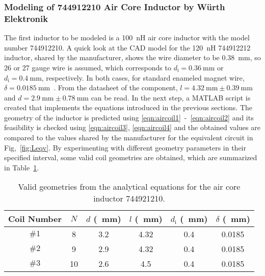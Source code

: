 \subsubsection{Modeling of 744912210 Air Core Inductor by Würth Elektronik}
The first inductor to be modeled is a \SI{100}{\nano\henry} air core inductor with the model number 744912210. A quick look at the CAD model for the \SI{120}{\nano\henry} 744912212 inductor, shared by the manufacturer, shows the wire diameter to be \SI{0.38}{\milli\meter}, so 26 or 27 gauge wire is assumed, which corresponds to $d_\mathrm{i} = \SI{0.36}{\milli\meter}$ or $d_\mathrm{i} = \SI{0.4}{\milli\meter}$, respectively. In both cases, for standard enameled magnet wire, $\delta = \SI{0.0185}{\milli\meter}$~\cite{electronbunker}. From the datasheet of the component, $l = \SI{4.32}{\milli\meter} \pm \SI{0.39}{\milli\meter}$ and $d = \SI{2.9}{\milli\meter} \pm \SI{0.78}{\milli\meter}$ can be read. In the next step, a MATLAB script is created that implements the equations introduced in the previous sections. The geometry of the inductor is predicted using \eqref{eqn:aircoil1}~-~\eqref{eqn:aircoil2} and its feasibility is checked using \eqref{eqn:aircoil3}, \eqref{eqn:aircoil4} and the obtained values are compared to the values shared by the manufacturer for the equivalent circuit in Fig,~\ref{fig:Leqv}. By experimenting with different geometry parameters in their specified interval, some valid coil geometries are obtained, which are summarized in Table~\ref{tab:valid_geom}.
\begin{table}[ptbh]
	\centering
	\begin{tabular}{|c| c c c c c|}
		\hline
		Coil Number & $N$ & $d$ (\SI{}{\milli\meter}) & $l$ (\SI{}{\milli\meter}) & $d_\mathrm{i}$ (\SI{}{\milli\meter}) & $\delta$ (\SI{}{\milli\meter})\\
		\hline
		$\#1$ & 8 & 3.2  & 4.32 & 0.4 & 0.0185 \\
		$\#2$ & 9 & 2.9 & 4.32 &  0.4 & 0.0185\\
		$\#3$ & 10 & 2.6 & 4.5 & 0.4 & 0.0185\\
		\hline
	\end{tabular} 
	\caption{Valid geometries from the analytical equations for the air core inductor 744921210.}
	\label{tab:valid_geom}
\end{table}
